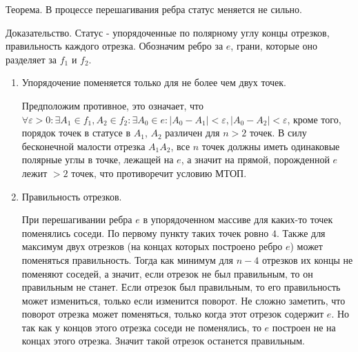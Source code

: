 \documentclass[letterpaper,12pt]{article}
\begin{document}
\hspace{4em}

\begin{center}
      Теорема. В процессе перешагивания ребра статус меняется не сильно.
\end{center}
Доказательство.
Статус - упорядоченные по полярному углу концы отрезков, 
правильность каждого отрезка. Обозначим ребро за $e$, грани, которые оно 
разделяет за $f_1$ и $f_2$.
\begin{enumerate}
      \item Упорядочение поменяется только для не более чем двух точек.
 
            Предположим противное, это означает, что
            $\forall \varepsilon > 0 : \exists A_1 \in f_1, A_2 \in f_2 : 
            \exists A_0 \in e  :  |A_0 - A_1|  < \varepsilon, 
            |A_0 - A_2|  < \varepsilon$,
            кроме того, порядок точек в статусе в $A_1$, $A_2$ различен 
            для $n > 2$ точек. В силу бесконечной малости отрезка $A_1 A_2$,
            все $n$ точек должны иметь одинаковые полярные углы в точке,
            лежащей на $e$, а значит на прямой, порожденной $e$ лежит $>2$
            точек, что противоречит условию МТОП.
      \item Правильность отрезков.

            При перешагивании ребра $e$ 
            в упорядоченном массиве для каких-то точек поменялись соседи.
            По первому пункту таких точек ровно $4$.
            Также для максимум двух отрезков (на концах которых построено ребро $e$)
            может поменяться правильность.
            Тогда как минимум для $n-4$ отрезков их концы не поменяют соседей,
            а значит, если отрезок не был правильным, то он правильным не станет.
            Если отрезок был правильным, то его правильность может измениться,
            только если изменится поворот.
            Не сложно заметить, что поворот отрезка может поменяться,
            только когда этот отрезок содержит $e$.
            Но так как у концов этого отрезка соседи не поменялись,
            то $e$ построен не на концах этого отрезка.
            Значит такой отрезок останется правильным.
\end{enumerate}
\end{document}
